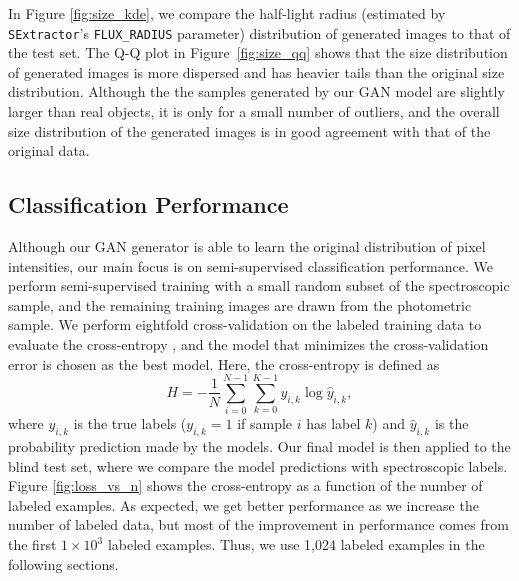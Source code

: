In Figure \ref{fig:size_kde}, we compare the half-light radius
(estimated by \texttt{SExtractor}'s \texttt{FLUX\_RADIUS} parameter) distribution of generated images to that of the test set.
The Q-Q plot in Figure~\ref{fig:size_qq} shows that the size distribution of generated images is more dispersed
and has heavier tails than the original size distribution.
Although the the samples generated by our GAN model are slightly larger than real objects,
it is only for a small number of outliers, and
the overall size distribution of the generated images is in good agreement with that of the original data.

\subsection{Classification Performance}
  \label{sec:classification}
  
Although our GAN generator is able to learn the original distribution of pixel intensities,
our main focus is on semi-supervised classification performance.
We perform semi-supervised training with a small random subset of the spectroscopic sample,
and the remaining training images are drawn from the photometric sample.
We perform eightfold cross-validation on the labeled training data to evaluate the cross-entropy
\citep[also called log loss;][]{murphy2012machine},
and the model that minimizes the cross-validation error is chosen as the best model.
Here, the cross-entropy is defined as
\begin{equation}
H = - \frac{1}{N} \sum_{i=0}^{N-1} \sum_{k=0}^{K-1} y_{i,k} \log \hat{y}_{i,k},
\end{equation}
where $y_{i,k}$ is the true labels (\ie $y_{i,k} = 1$ if sample $i$ has label $k$) and
$\hat{y}_{i,k}$ is the probability prediction made by the models.
Our final model is then applied to the blind test set, where we compare the model predictions with spectroscopic labels.
Figure \ref{fig:loss_vs_n} shows the cross-entropy as a function of the number of labeled examples.
As expected, we get better performance as we increase the number of labeled data,
but most of the improvement in performance comes from the first $1 \times 10^3$ labeled examples.
Thus, we use 1,024 labeled examples in the following sections.


